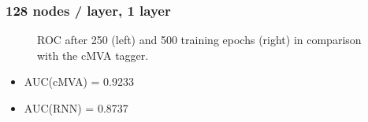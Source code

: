 \documentclass{beamer}
\begin{document}
\begin{frame}
  \frametitle{128 nodes / layer, 1 layer}

  \begin{figure}[htb]
    \centering

    \caption{ROC after 250 (left) and 500 training epochs (right) in comparison with the cMVA tagger.}
  \end{figure}

  \begin{itemize}
  \item AUC(cMVA) = 0.9233
  \item AUC(RNN) = 0.8737
  \end{itemize}

\end{frame}
\end{document}
